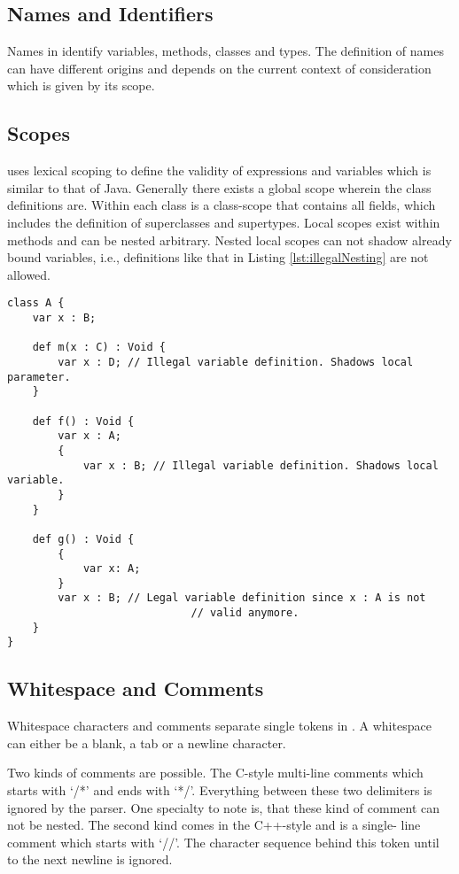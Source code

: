 \subsection{Names and Identifiers}
Names in \ooplss identify variables, methods, classes and types. The
definition of names can have different origins and depends on the current
context of consideration which is given by its scope.


\subsection{Scopes}
\ooplss uses lexical scoping to define the validity of expressions and 
variables which is similar to that of Java. Generally there exists a global
scope wherein the class definitions are. Within each class is a class-scope
that contains all fields, which includes the definition of superclasses and
supertypes. Local scopes exist within methods and can be nested arbitrary.
Nested local scopes can not shadow already bound variables, i.e., definitions
like that in Listing \ref{lst:illegalNesting} are not allowed.

\begin{lstlisting}[float,language=ooplss,caption=Variable definition in local scope,label=lst:illegalNesting]
class A {
	var x : B;

	def m(x : C) : Void {
		var x : D; // Illegal variable definition. Shadows local parameter.
	}

	def f() : Void {
		var x : A; 
		{
			var x : B; // Illegal variable definition. Shadows local variable.
		}
	}

	def g() : Void {
		{
			var x: A;
		}
		var x : B; // Legal variable definition since x : A is not 
							 // valid anymore.
	}
}
\end{lstlisting}
\subsection{Whitespace and Comments}
Whitespace characters and comments separate single tokens in \ooplss. A
whitespace can either be a blank, a tab or a newline character.

Two kinds of comments are possible. The C-style multi-line comments which
starts with `/*' and ends with `*/'. Everything between these two delimiters
is ignored by the parser. One specialty to note is, that these kind of comment
can not be nested. The second kind comes in the C++-style and is a single-
line comment which starts with `//'. The character sequence behind this token
until to the next newline is ignored.


